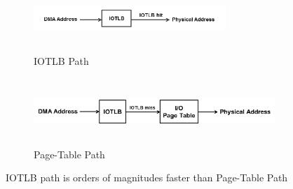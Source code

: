 \begin{figure}[t!]
    \centering
    \begin{subfigure}[t]{0.5\textwidth}
        \centering
        \includegraphics[height=1.0in, width=0.8\textwidth]{image/background/DMA-IOTLB-translation.png}
        \caption{IOTLB Path}
        \label{fig:subfig:a}
    \end{subfigure}%
    \begin{subfigure}[t]{0.5\textwidth}
        \centering
        \includegraphics[height=1.0in, width=1.1\textwidth]{image/background/DMA-pt-translation.png}
        \caption{Page-Table Path}
        \label{fig:subfig:b}
    \end{subfigure}
    \caption{IOTLB path is orders of magnitudes faster than Page-Table Path}
    \label{fig:dma-add-trans}
\end{figure}




